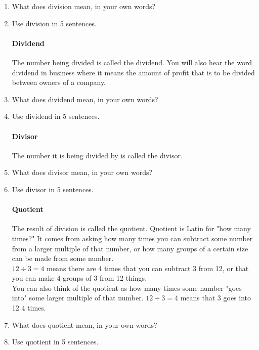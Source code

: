 \documentclass[12pt]{article}
\begin{document}
\begin{enumerate}

\item What does division mean, in your own words?
\item Use division in 5 sentences.

\paragraph{Dividend}
The number being divided is called the dividend. You will also hear the word dividend in business where it means the amount of profit that is to be divided between owners of a company.\\

\item What does dividend mean, in your own words?
\item Use dividend in 5 sentences.

\paragraph{Divisor}
The number it is being divided by is called the divisor.\\

\item What does divisor mean, in your own words?
\item Use divisor in 5 sentences.

\paragraph{Quotient}
The result of division is called the quotient. Quotient is Latin for "how many times?" It comes from asking how many times you can subtract some number from a larger multiple of that number, or how many groups of a certain size can be made from some number.\\

$12 \div 3 = 4$ means there are 4 times that you can subtract 3 from 12, or that you can make 4 groups of 3 from 12 things.\\

You can also think of the quotient as how many times some number "goes into" some larger multiple of that number. $12 \div 3 = 4$ means that 3 goes into 12 4 times.\\

\item What does quotient mean, in your own words?
\item Use quotient in 5 sentences.


\end{enumerate}
\end{document}
